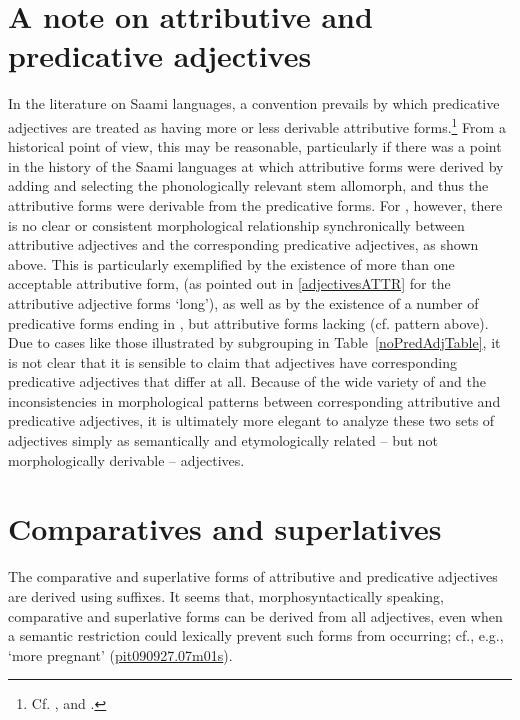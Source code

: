 \section{A note on attributive and predicative adjectives}\label{notePredNounsAdjs}
In the literature on Saami languages, a convention prevails by which predicative adjectives are treated as having more or less derivable attributive forms.\footnote{Cf. \citet[71]{Sammallahti1998}, \citet[74-76;98]{Svonni2009} and \citet[179]{Feist2010}.} 
From a historical point of view, this may be reasonable, particularly if there was a point in the history of the Saami languages at which attributive forms were derived by adding \mbox{} and selecting the phonologically relevant stem allomorph, and thus the attributive forms were derivable from the predicative forms. For \PS, however, there is no clear or consistent morphological relationship synchronically between attributive adjectives and the corresponding predicative adjectives, as shown above. This is particularly exemplified by the existence of more than one acceptable attributive form, (as pointed out in \SEC\ref{adjectivesATTR} for the attributive adjective forms \TILDE{} ‘long’), as well as by the existence of a number of predicative forms ending in , but attributive forms lacking  (cf. pattern  above). 
Due to cases like those illustrated by subgrouping  in Table~\ref{noPredAdjTable}, it is not clear that it is sensible to claim that  adjectives have corresponding predicative adjectives that differ at all. 
Because of the wide variety of and the inconsistencies in morphological patterns between corresponding attributive and predicative adjectives, it is ultimately more elegant to analyze these two sets of adjectives simply as semantically and etymologically related – but not morphologically derivable – adjectives. 


\section{Comparatives and superlatives}\label{compSuperlADJs}
The comparative and superlative %
forms of attributive and predicative adjectives are derived using suffixes. It seems that, morphosyntactically speaking, comparative and superlative forms can be derived from all adjectives, even when a semantic restriction could lexically prevent such forms from occurring; cf., e.g.,~ ‘more pregnant’ (\hyperlink{pit090927}{pit090927.07m01s}). 

